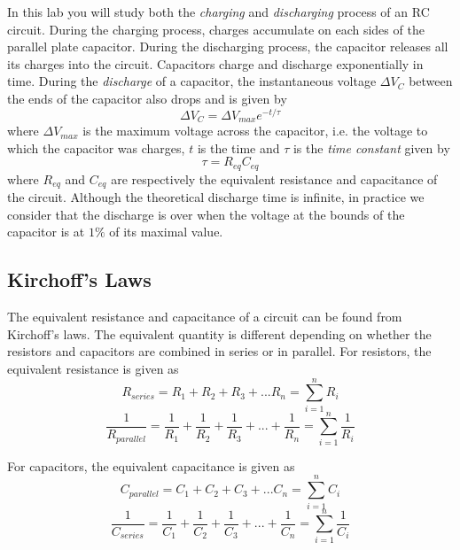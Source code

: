 \documentclass[12pt]{report}
\begin{document}
In this lab you will study both the \textit{charging} and \textit{discharging} process of an RC circuit. During the charging process, charges accumulate on each sides of the parallel plate capacitor. During the discharging process, the capacitor releases all its charges into the circuit. Capacitors charge and discharge exponentially in time. During the \textit{discharge} of a capacitor, the instantaneous voltage $\Delta V_C$ between the ends of the capacitor also drops and is given by
\begin{equation}
\Delta V_C = \Delta V_{max} e^{-t/\tau}
\label{Eq:V-discharge}
\end{equation}
where $\Delta V_{max}$ is the maximum voltage across the capacitor, i.e. the voltage to which the capacitor was charges, $t$ is the time and $\tau$ is the \textit{time constant} given by
\begin{equation}
\tau = R_{eq} C_{eq}
\label{Eq:time-constant}
\end{equation}
where $R_{eq}$ and $C_{eq}$ are respectively the equivalent resistance and capacitance of the circuit. Although the theoretical discharge time is infinite, in practice we consider that the discharge is over when the voltage at the bounds of the capacitor is at $1\%$ of its maximal value. 

\subsection{Kirchoff's Laws}
The equivalent resistance and capacitance of a circuit can be found from Kirchoff's laws. The equivalent quantity is different depending on whether the resistors and capacitors are combined in series or in parallel. For resistors, the equivalent resistance is given as
\begin{equation}
R_{series} = R_1 + R_2 + R_3 + ... R_n = \displaystyle \sum_{i=1}^n R_i
\end{equation}
\begin{equation}
\frac{1}{R_{parallel}} = \frac{1}{R_1} + \frac{1}{R_2} + \frac{1}{R_3} + ... + \frac{1}{R_n} = \displaystyle \sum_{i=1}^n \frac{1}{R_i}
\end{equation}

For capacitors, the equivalent capacitance is given as
\begin{equation}
C_{parallel} = C_1 + C_2 + C_3 + ... C_n = \displaystyle \sum_{i=1}^n C_i
\end{equation}
\begin{equation}
\frac{1}{C_{series}} =  \frac{1}{C_1} + \frac{1}{C_2} + \frac{1}{C_3} + ... + \frac{1}{C_n} = \displaystyle  \sum_{i=1}^n \frac{1}{C_i}
\end{equation}
\end{document}
